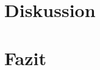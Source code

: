 \documentclass[a4paper, 12pt]{article}
\begin{document}

\newpage
\section{Diskussion}

\newpage
\section{Fazit}

\newpage


\end{document}
